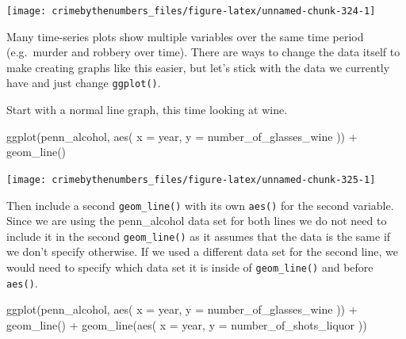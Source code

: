 \documentclass[
]{krantz}
\makeatletter
\newenvironment{Shaded}{\begin{snugshade}}{\end{snugshade}}
\newcommand{\AttributeTok}[1]{\textcolor[rgb]{0.61,0.61,0.61}{#1}}
\newcommand{\FunctionTok}[1]{\textcolor[rgb]{0,0,0}{#1}}
\newcommand{\NormalTok}[1]{#1}
\newcommand{\SpecialCharTok}[1]{\textcolor[rgb]{0,0,0}{#1}}
\newenvironment{kframe}{%
\medskip{}
\setlength{\fboxsep}{.8em}
 \def\at@end@of@kframe{}%
 \ifinner\ifhmode%
  \def\at@end@of@kframe{\end{minipage}}%
  \begin{minipage}{\columnwidth}%
 \fi\fi%
 \def\FrameCommand##1{\hskip\@totalleftmargin \hskip-\fboxsep
 \colorbox{shadecolor}{##1}\hskip-\fboxsep
     \hskip-\linewidth \hskip-\@totalleftmargin \hskip\columnwidth}%
 \MakeFramed {\advance\hsize-\width
   \@totalleftmargin\z@ \linewidth\hsize
   \@setminipage}}%
 {\par\unskip\endMakeFramed%
 \at@end@of@kframe}
\renewenvironment{Shaded}{\begin{kframe}}{\end{kframe}}
\makeatother
\begin{document}
\begin{center}\texttt{[image: crimebythenumbers\_files/figure-latex/unnamed-chunk-324-1]} \end{center}

Many time-series plots show multiple variables over the same
time period (e.g.~murder and robbery over time). There are
ways to change the data itself to make creating graphs like
this easier, but let's stick with the data we currently have
and just change \texttt{ggplot()}.

Start with a normal line graph, this time looking at wine.

\begin{Shaded}
\begin{Highlighting}[]
\FunctionTok{ggplot}\NormalTok{(penn\_alcohol, }\FunctionTok{aes}\NormalTok{(}
  \AttributeTok{x =}\NormalTok{ year,}
  \AttributeTok{y =}\NormalTok{ number\_of\_glasses\_wine}
\NormalTok{)) }\SpecialCharTok{+}
  \FunctionTok{geom\_line}\NormalTok{()}
\end{Highlighting}
\end{Shaded}

\begin{center}\texttt{[image: crimebythenumbers\_files/figure-latex/unnamed-chunk-325-1]} \end{center}

Then include a second \texttt{geom\_line()} with its own
\texttt{aes()} for the second variable. Since we are using
the penn\_alcohol data set for both lines we do not need to
include it in the second \texttt{geom\_line()} as it assumes
that the data is the same if we don't specify otherwise. If
we used a different data set for the second line, we would
need to specify which data set it is inside of
\texttt{geom\_line()} and before \texttt{aes()}.

\begin{Shaded}
\begin{Highlighting}[]
\FunctionTok{ggplot}\NormalTok{(penn\_alcohol, }\FunctionTok{aes}\NormalTok{(}
  \AttributeTok{x =}\NormalTok{ year,}
  \AttributeTok{y =}\NormalTok{ number\_of\_glasses\_wine}
\NormalTok{)) }\SpecialCharTok{+}
  \FunctionTok{geom\_line}\NormalTok{() }\SpecialCharTok{+}
  \FunctionTok{geom\_line}\NormalTok{(}\FunctionTok{aes}\NormalTok{(}
    \AttributeTok{x =}\NormalTok{ year,}
    \AttributeTok{y =}\NormalTok{ number\_of\_shots\_liquor}
\NormalTok{  ))}
\end{Highlighting}
\end{Shaded}
\end{document}
